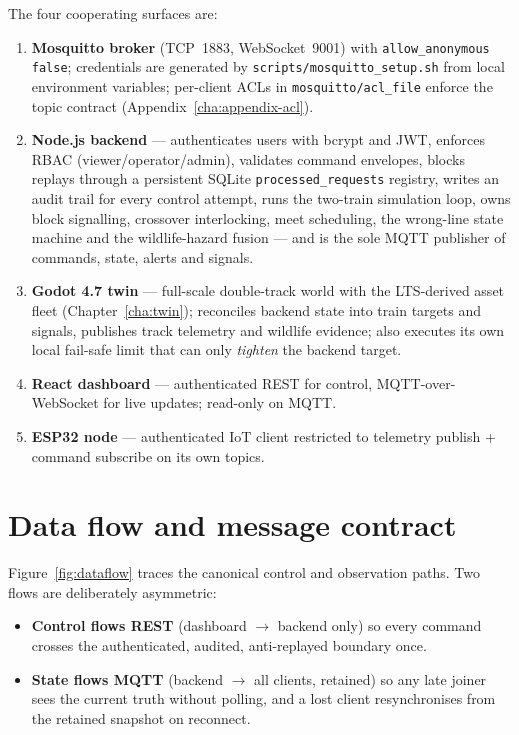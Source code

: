 The four cooperating surfaces are:

\begin{enumerate}
  \item \textbf{Mosquitto broker} (TCP~1883, WebSocket~9001) with
        \texttt{allow\_anonymous false}; credentials are generated by
        \texttt{scripts/mosquitto\_setup.sh} from local environment
        variables; per-client ACLs in \texttt{mosquitto/acl\_file} enforce
        the topic contract (Appendix~\ref{cha:appendix-acl}).
  \item \textbf{Node.js backend} --- authenticates users with bcrypt and
        JWT, enforces RBAC (viewer/operator/admin), validates command
        envelopes, blocks replays through a persistent SQLite
        \texttt{processed\_requests} registry, writes an audit trail for
        every control attempt, runs the two-train simulation loop, owns
        block signalling, crossover interlocking, meet scheduling, the
        wrong-line state machine and the wildlife-hazard fusion --- and is
        the sole MQTT publisher of commands, state, alerts and signals.
  \item \textbf{Godot 4.7 twin} --- full-scale double-track world with the
        LTS-derived asset fleet (Chapter~\ref{cha:twin}); reconciles
        backend state into train targets and signals, publishes track
        telemetry and wildlife evidence; also executes its own local
        fail-safe limit that can only \emph{tighten} the backend target.
  \item \textbf{React dashboard} --- authenticated REST for control,
        MQTT-over-WebSocket for live updates; read-only on MQTT.
  \item \textbf{ESP32 node} --- authenticated IoT client restricted to
        telemetry publish + command subscribe on its own topics.
\end{enumerate}

\section{Data flow and message contract}

Figure~\ref{fig:dataflow} traces the canonical control and observation
paths. Two flows are deliberately asymmetric:

\begin{itemize}
  \item \textbf{Control flows REST} (dashboard $\rightarrow$ backend only)
        so every command crosses the authenticated, audited, anti-replayed
        boundary once.
  \item \textbf{State flows MQTT} (backend $\rightarrow$ all clients,
        retained) so any late joiner sees the current truth without
        polling, and a lost client resynchronises from the retained
        snapshot on reconnect.
\end{itemize}

